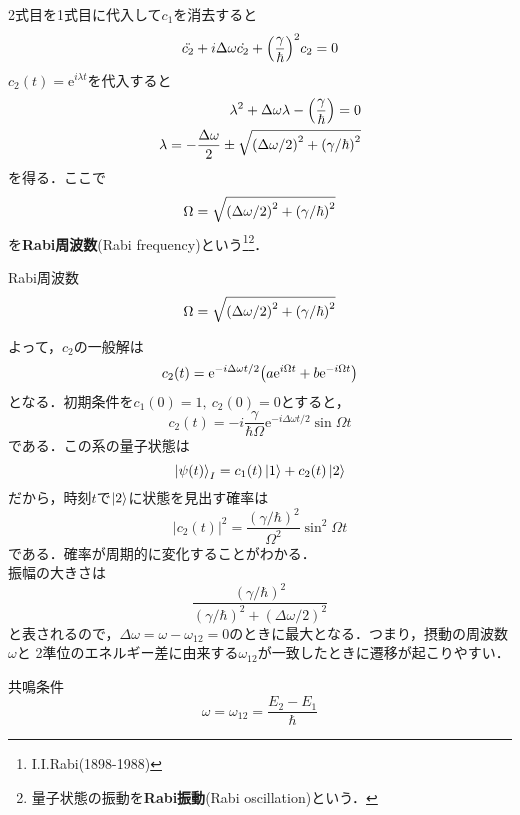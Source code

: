 \documentclass{standalone}
\begin{document}
  2式目を1式目に代入して$c_1$を消去すると
  \begin{equation}
    \ddot{c_2}+i\Delta\omega\dot{c_2}+\qty(\frac{\gamma}{\hbar})^2c_2=0
  \end{equation}
  $c_2(t)=\mathrm{e}^{i\lambda t}$を代入すると
  \begin{align}
    \lambda^2+\Delta\omega\lambda-\qty(\frac{\gamma}{\hbar})=0\\
    \lambda=-\frac{\Delta\omega}{2}\pm\sqrt{\qty(\Delta\omega/2)^2+\qty(\gamma/\hbar)^2}
  \end{align}
  を得る．ここで
  \begin{equation}
    \Omega=\sqrt{\qty(\Delta\omega/2)^2+\qty(\gamma/\hbar)^2}
  \end{equation}
  を\textbf{Rabi周波数}(Rabi frequency)という\footnote{I.I.Rabi(1898-1988)}\footnote{量子状態の振動を\textbf{Rabi振動}(Rabi oscillation)という．}．
  \begin{itembox}[l]{Rabi周波数}
    \begin{equation}
    \Omega=\sqrt{\qty(\Delta\omega/2)^2+\qty(\gamma/\hbar)^2}   
    \end{equation}
  \end{itembox}
  よって，$c_2$の一般解は
  \begin{equation}
    c_2(t)=\mathrm{e}^{-i\Delta\omega t/2}\qty(a\mathrm{e}^{i\Omega t}+b\mathrm{e}^{-i\Omega t})
  \end{equation}
  となる．初期条件を$c_1(0)=1,\ c_2(0)=0$とすると，
  \begin{equation}
    c_2(t)=-i\frac{\gamma}{\hbar\Omega}\mathrm{e}^{-i\Delta\omega t/2}\sin\Omega t
  \end{equation}
  である．この系の量子状態は
  \begin{equation}
    \ket{\psi(t)}_I=c_1(t)\ket{1}+c_2(t)\ket{2}
  \end{equation}
  だから，時刻$t$で$\ket{2}$に状態を見出す確率は
  \begin{equation}
    |c_2(t)|^2=\frac{(\gamma/\hbar)^2}{\Omega^2}\sin^2\Omega t
  \end{equation}
  である．確率が周期的に変化することがわかる．\\
  振幅の大きさは
  \begin{equation}
    \frac{(\gamma/\hbar)^2}{(\gamma/\hbar)^2+(\Delta\omega/2)^2}
  \end{equation}
  と表されるので，$\Delta\omega=\omega-\omega_{12}=0$のときに最大となる．つまり，摂動の周波数$\omega$と
  2準位のエネルギー差に由来する$\omega_{12}$が一致したときに遷移が起こりやすい．
  \begin{itembox}[l]{共鳴条件}
    \begin{equation}
      \omega=\omega_{12}=\frac{E_2-E_1}{\hbar}
    \end{equation}  
  \end{itembox}
\end{document}

